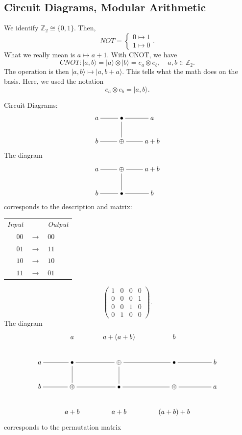 \documentclass[12pt]{article}
\theoremstyle{definition}
\newcommand{\ket}[1]{|#1\rangle}
\newcommand{\Z}{\mathbb{Z}}
\begin{document}
\subsection{Circuit Diagrams, Modular Arithmetic}

We identify $\Z_2 \cong \{0,1\}$. Then,
\[
NOT = \begin{cases}
0 \mapsto 1\\
1 \mapsto 0
\end{cases}.
\]
What we really mean is $a \mapsto a+1$. With CNOT, we have
\[
CNOT: \ket{a,b} = \ket{a} \otimes \ket{b} = e_a \otimes e_b, \quad a,b \in \Z_2.
\]
The operation is then $\ket{a,b} \mapsto \ket{a,b+a}$. This tells what the math does on the basis. Here, we used the notation
\[
e_a \otimes e_b = \ket{a,b}.
\]

Circuit Diagrams:
\[
\xymatrix@C=2.4em@R=2.2em{
a \ar@{-}[r] & \bullet \ar@{-}[d] \ar@{-}[r] & a \\
b \ar@{-}[r] & \oplus \ar@{-}[r] & a+b
}
\]
The diagram
\[
\xymatrix@C=2.4em@R=2.2em{
a \ar@{-}[r] & \oplus \ar@{-}[d] \ar@{-}[r] & a+b \\
b \ar@{-}[r] & \bullet \ar@{-}[r] & b
}
\]
corresponds to the description and matrix:
\begin{center}
\begin{tabular}{rcl}
\textit{Input} & & \textit{Output} \\
$00$ & $\to$ & $00$ \\
$01$ & $\to$ & $11$ \\
$10$ & $\to$ & $10$ \\
$11$ & $\to$ & $01$
\end{tabular}
\end{center}
\[
\begin{pmatrix}
1&0&0&0\\
0&0&0&1\\
0&0&1&0\\
0&1&0&0
\end{pmatrix}.
\]
The diagram
\[
\xymatrix@C=2.8em@R=2.2em{
 & a & a+(a+b) & b & \\
a \ar@{-}[r] & \bullet \ar@{-}[d] \ar@{-}[r] & \oplus \ar@{-}[d] \ar@{-}[r] & \bullet \ar@{-}[r] & b \\
b \ar@{-}[r] & \oplus \ar@{-}[r] & \bullet \ar@{-}[r] & \oplus \ar@{-}[r] & a \\
 & a+b & a+b & (a+b)+b &
}
\]
corresponds to the permutation matrix
\end{document}

